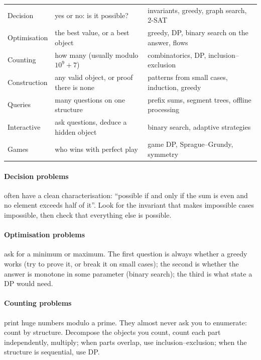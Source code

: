 \begin{center}
\small
\begin{tabularx}{\linewidth}{p{2.6cm}Lp{4.8cm}}
\toprule
{} &  &  \\
\midrule
Decision & yes or no: is it possible? & invariants, greedy, graph search, 2-SAT \\
Optimisation & the best value, or a best object & greedy, DP, binary search on the answer, flows \\
Counting & how many (usually modulo $10^9+7$) & combinatorics, DP, inclusion--exclusion \\
Construction & any valid object, or proof there is none & patterns from small cases, induction, greedy \\
Queries & many questions on one structure & prefix sums, segment trees, offline processing \\
Interactive & ask questions, deduce a hidden object & binary search, adaptive strategies \\
Games & who wins with perfect play & game DP, Sprague--Grundy, symmetry \\
\bottomrule
\end{tabularx}
\end{center}

\paragraph{Decision problems} often have a clean characterisation: ``possible if and only if the sum is even and no element
exceeds half of it''. Look for the invariant that makes impossible cases impossible, then check that everything else is
possible.

\paragraph{Optimisation problems} ask for a minimum or maximum. The first question is always whether a greedy works (try to
prove it, or break it on small cases); the second is whether the answer is monotone in some parameter (binary search); the
third is what state a DP would need.

\paragraph{Counting problems} print huge numbers modulo a prime. They almost never ask you to enumerate: count by
structure. Decompose the objects you count, count each part independently, multiply; when parts overlap, use
inclusion--exclusion; when the structure is sequential, use DP.

